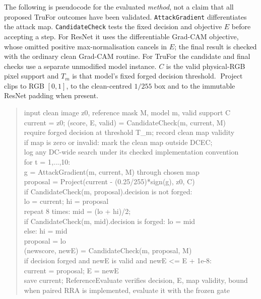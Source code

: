 The following is pseudocode for the evaluated \emph{method}, not a claim that all proposed TruFor outcomes have been validated. \texttt{AttackGradient} differentiates the attack map. \texttt{CandidateCheck} tests the fixed decision and objective $E$ before accepting a step. For ResNet it uses the differentiable Grad-CAM objective, whose omitted positive max-normalisation cancels in $E$; the final result is checked with the ordinary clean Grad-CAM routine. For TruFor the candidate and final checks use a separate unmodified model instance. $C$ is the valid physical-RGB pixel support and $T_m$ is that model's fixed forged decision threshold. $\operatorname{Project}$ clips to RGB $[0,1]$, to the clean-centred $1/255$ box and to the immutable ResNet padding when present.

\begin{quote}\footnotesize\ttfamily
input clean image z0, reference mask M, model m, valid support C\\
current = z0; (score, E, valid) = CandidateCheck(m, current, M)\\
require forged decision at threshold T\_m; record clean map validity\\
if map is zero or invalid: mark the clean map outside DCEC;\\
\quad log any DC-wide search under its checked implementation convention\\
for t = 1,...,10:\\
\quad g = AttackGradient(m, current, M) through chosen map\\
\quad proposal = Project(current - (0.25/255)*sign(g), z0, C)\\
\quad if CandidateCheck(m, proposal).decision is not forged:\\
\qquad lo = current; hi = proposal\\
\qquad repeat 8 times: mid = (lo + hi)/2;\\
\qquad\quad if CandidateCheck(m, mid).decision is forged: lo = mid\\
\qquad\quad else: hi = mid\\
\qquad proposal = lo\\
\quad (newscore, newE) = CandidateCheck(m, proposal, M)\\
\quad if decision forged and newE is valid and newE <= E + 1e-8:\\
\qquad current = proposal; E = newE\\
save current; ReferenceEvaluate verifies decision, E, map validity, bound\\
when paired RRA is implemented, evaluate it with the frozen gate
\end{quote}

